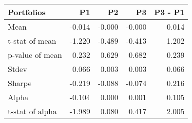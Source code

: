 \begin{tabular}{lrrrr}
\toprule
Portfolios & P1 & P2 & P3 & P3 - P1 \\
\midrule
Mean & -0.014 & -0.000 & -0.000 & 0.014 \\
t-stat of mean & -1.220 & -0.489 & -0.413 & 1.202 \\
p-value of mean & 0.232 & 0.629 & 0.682 & 0.239 \\
Stdev & 0.066 & 0.003 & 0.003 & 0.066 \\
Sharpe & -0.219 & -0.088 & -0.074 & 0.216 \\
Alpha & -0.104 & 0.000 & 0.001 & 0.105 \\
t-stat of alpha & -1.989 & 0.080 & 0.417 & 2.005 \\
\bottomrule
\end{tabular}
